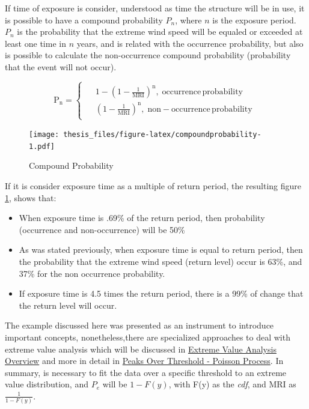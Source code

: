 \documentclass[12pt,oneside]{reedthesis}
\providecommand{\tightlist}{%
  \setlength{\itemsep}{0pt}\setlength{\parskip}{0pt}}
\begin{document}
If time of exposure is consider, understood as time the structure will be in use, it is possible to have a compound probability \(P_n\), where \(n\) is the exposure period. \(P_n\) is the probability that the extreme wind speed will be equaled or exceeded at least one time in \(n\) years, and is related with the occurrence probability, but also is possible to calculate the non-occurrence compound probability (probability that the event will not occur).

\[
  \mathrm{
    P_n = 
    \begin{cases}
      \begin{split}
            &1-\left(1-\frac{1}{MRI}\right)^n,\;occurrence\,probability
            \\
            &\left(1-\frac{1}{MRI}\right)^n,\;non-occurrence\,probability
      \end{split}
    \end{cases}
  }
\]

\footnotesize
\begin{figure}
\centering
\texttt{[image: thesis\_files/figure-latex/compoundprobability-1.pdf]}
\caption{\label{fig:compoundprobability}Compound Probability}
\end{figure}
\normalsize

If it is consider exposure time as a multiple of return period, the resulting figure \ref{fig:compoundprobability}, shows that:
\begin{itemize}
\tightlist
\item
  When exposure time is .69\% of the return period, then probability (occurrence and non-occurrence) will be 50\%
\item
  As was stated previously, when exposure time is equal to return period, then the probability that the extreme wind speed (return level) occur is 63\%, and 37\% for the non occurrence probability.
\item
  If exposure time is 4.5 times the return period, there is a 99\% of change that the return level will occur.
\end{itemize}
The example discussed here was presented as an instrument to introduce important concepts, nonetheless,there are specialized approaches to deal with extreme value analysis which will be discussed in \protect\hyperlink{extremeoverview}{Extreme Value Analysis Overview} and more in detail in \protect\hyperlink{pot-pp}{Peaks Over Threshold - Poisson Process}. In summary, is necessary to fit the data over a specific threshold to an extreme value distribution, and \(P_e\) will be \(1-F(y)\), with F(y) as the \emph{cdf}, and MRI as \(\frac{1}{1-F(y)}\).
\end{document}
